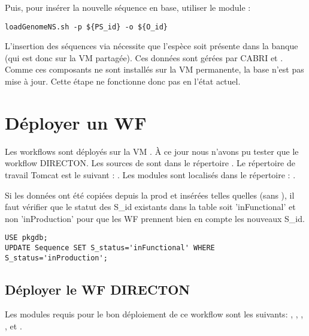 Puis, pour insérer la nouvelle séquence en base, utiliser le module :
\begin{lstlisting}[style=bash,gobble=4]
    loadGenomeNS.sh -p ${PS_id} -o ${O_id}
\end{lstlisting}

\begin{warningbox}
    L'insertion des séquences via  nécessite que l'espèce soit présente dans la banque  (qui est donc sur la VM partagée).
    Ces données sont gérées par CABRI et .
    Comme ces composants ne sont installés sur la VM permanente, la base  n'est pas mise à jour.
    Cette étape ne fonctionne donc pas en l'état actuel.
\end{warningbox}

\section{Déployer un WF} \label{sec:deployer_wf}

Les workflows sont déployés sur la VM .
À ce jour nous n'avons pu tester que le workflow DIRECTON.
Les sources de  sont dans le répertoire .
Le répertoire de travail Tomcat est le suivant : .
Les modules sont localisés dans le répertoire : .

\begin{warningbox}
    Si les données ont été copiées depuis la prod et insérées telles quelles (sans ), il faut vérifier que le statut des S\_id existants dans la table  soit 'inFunctional' et non 'inProduction' pour que les WF prennent bien en compte les nouveaux S\_id.
\end{warningbox}

\begin{lstlisting}[style=SQL]
USE pkgdb;
UPDATE Sequence SET S_status='inFunctional' WHERE S_status='inProduction';
\end{lstlisting}

\subsection{Déployer le WF DIRECTON}

Les modules requis pour le bon déploiement de ce workflow sont les suivants: , , , ,  et .

